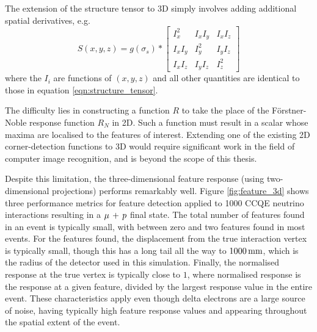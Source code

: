 The extension of the structure tensor to 3D simply involves adding additional spatial derivatives, e.g.
\begin{equation}\label{eqn:structure_tensor_3d}
    S(x,y,z) = g(\sigma_s) \ast \left[ \begin{array}{ccc} I_x^2 & I_x I_y & I_x I_z \\ I_x I_y & I_y^2 & I_y I_z \\ I_x I_z & I_y I_z & I_z^2\end{array} \right]
\end{equation}
where the $I_{i}$ are functions of $(x,y,z)$ and all other quantities are identical to those in equation \eqref{eqn:structure_tensor}.

The difficulty lies in constructing a function $R$ to take the place of the F\"orstner-Noble response function $R_N$ in 2D. Such a function must result in a scalar whose maxima are localised to the features of interest. Extending one of the existing 2D corner-detection functions to 3D would require significant work in the field of computer image recognition, and is beyond the scope of this thesis.

Despite this limitation, the three-dimensional feature response (using two-dimensional projections) performs remarkably well. Figure \ref{fig:feature_3d} shows three performance metrics for feature detection applied to 1000 \ac{CCQE} neutrino interactions resulting in a $\mu\,+\,p$ final state. The total number of features found in an event is typically small, with between zero and two features found in most events. For the features found, the displacement from the true interaction vertex is typically small, though this has a long tail all the way to $1000\,\mathrm{mm}$, which is the radius of the detector used in this simulation. Finally, the normalised response at the true vertex is typically close to $1$, where normalised response is the response at a given feature, divided by the largest response value in the entire event. These characteristics apply even though delta electrons are a large source of noise, having typically high feature response values and appearing throughout the spatial extent of the event.

